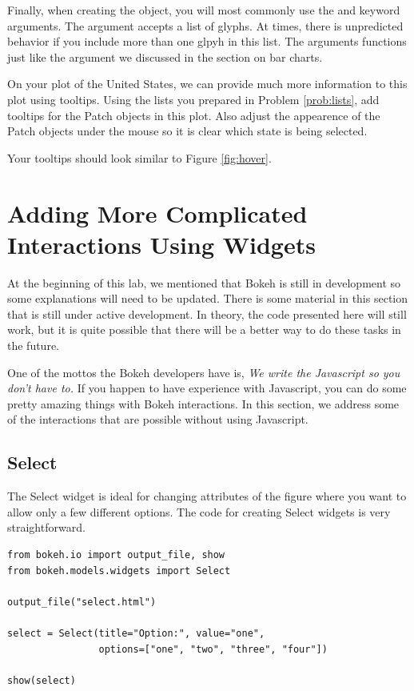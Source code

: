 Finally, when creating the  object, you will most commonly use
the  and  keyword arguments. The 
argument accepts a list of glyphs. At times, there is unpredicted behavior if you
include more than one glpyh in this list. The  arguments functions
just like the  argument we discussed in the section on bar charts.

\begin{problem} \label{prob:hover_map}
On your plot of the United States, we can provide much more information to this
plot using tooltips. Using the lists you prepared in Problem \ref{prob:lists},
add tooltips for the Patch objects in this plot. Also adjust the appearence of
the Patch objects under the mouse so it is clear which state is being selected.

Your tooltips should look similar to Figure \ref{fig:hover}.

\end{problem}



\section*{Adding More Complicated Interactions Using Widgets}
\begin{info}
At the beginning of this lab, we mentioned that Bokeh is still in development
so some explanations will need to be updated. There is some material in this
section that is still under active development. In theory, the code presented
here will still work, but it is quite possible that there will be a better way
to do these tasks in the future.
\end{info}

One of the mottos the Bokeh developers have is, \emph{We write the Javascript so
you don't have to.} If you happen to have experience with Javascript, you can
do some pretty amazing things with Bokeh interactions. In this section, we
address some of the interactions that are possible without using Javascript.

\subsection*{Select}
The Select widget is ideal for changing attributes of the figure where you want
to allow only a few different options. The code for creating Select widgets is
very straightforward.

\begin{lstlisting}
from bokeh.io import output_file, show
from bokeh.models.widgets import Select

output_file("select.html")

select = Select(title="Option:", value="one",
                options=["one", "two", "three", "four"])

show(select)
\end{lstlisting}

